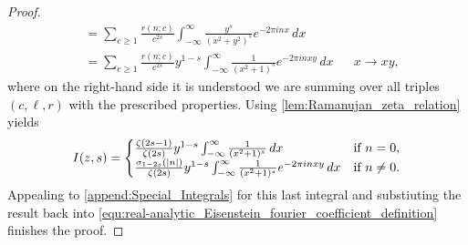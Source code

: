 \begin{proof}
\begin{align*}
          &= \sum_{c \ge 1}\frac{r(n;c)}{c^{2s}}\int_{-\infty}^{\infty}\frac{y^{s}}{(x^{2}+y^{2})^{s}}e^{-2\pi inx}\,dx \\
          &= \sum_{c \ge 1}\frac{r(n;c)}{c^{2s}}y^{1-s}\int_{-\infty}^{\infty}\frac{1}{(x^{2}+1)^{s}}e^{-2\pi inxy}\,dx && \text{$x \to xy$},
        \end{align*}
        where on the right-hand side it is understood we are summing over all triples $(c,\ell,r)$ with the prescribed properties. Using \cref{lem:Ramanujan_zeta_relation} yields
        \[
         I(z,s) = \begin{cases} \frac{\zeta(2s-1)}{\zeta(2s)}y^{1-s}\int_{-\infty}^{\infty}\frac{1}{(x^{2}+1)^{s}}\,dx & \text{if $n = 0$}, \\ \frac{\sigma_{1-2s}(|n|)}{\zeta(2s)}y^{1-s}\int_{-\infty}^{\infty}\frac{1}{(x^{2}+1)^{s}}e^{-2\pi inxy}\,dx & \text{if $n \neq 0$}. \end{cases}
        \]
        Appealing to \cref{append:Special_Integrals} for this last integral and substiuting the result back into \cref{equ:real-analytic_Eisenstein_fourier_coefficient_definition} finishes the proof.
      \end{proof}
